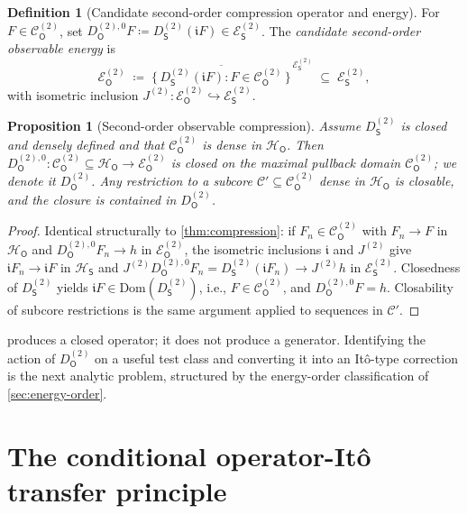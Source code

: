 \documentclass[11pt,reqno]{amsart}
\theoremstyle{plain}
\newtheorem{proposition}[theorem]{Proposition}
\theoremstyle{definition}
\newtheorem{definition}[theorem]{Definition}
\theoremstyle{remark}
\newcommand{\Hilb}{\mathcal{H}}
\newcommand{\Dom}{\mathrm{Dom}}
\newcommand{\Energy}{\mathcal{E}}
\newcommand{\Source}{\mathsf{S}}
\newcommand{\Obs}{\mathsf{O}}
\renewcommand{\iota}{\mathfrak{i}}
\begin{document}
\begin{definition}[Candidate second-order compression operator and energy]
\label{def:compression-2}
For $F\in\mathcal C_\Obs^{(2)}$, set
$D_\Obs^{(2),0}F\coloneqq D_\Source^{(2)}(\iota F)
\in\Energy_\Source^{(2)}$.
The \emph{candidate second-order observable energy} is
\[
  \Energy_\Obs^{(2)}
  \;\coloneqq\;
  \overline{\bigl\{\,D_\Source^{(2)}(\iota F):F\in\mathcal C_\Obs^{(2)}\,\bigr\}}
   ^{\,\Energy_\Source^{(2)}}
  \;\subseteq\;\Energy_\Source^{(2)},
\]
with isometric inclusion
$J^{(2)}\colon\Energy_\Obs^{(2)}\hookrightarrow\Energy_\Source^{(2)}$.
\end{definition}

\begin{proposition}[Second-order observable compression]
\label{prop:compression-2}
Assume $D_\Source^{(2)}$ is closed and densely defined and that
$\mathcal C_\Obs^{(2)}$ is dense in $\Hilb_\Obs$. Then
$D_\Obs^{(2),0}\colon\mathcal C_\Obs^{(2)}\subseteq\Hilb_\Obs
\to\Energy_\Obs^{(2)}$ is closed on the maximal pullback domain
$\mathcal C_\Obs^{(2)}$; we denote it $D_\Obs^{(2)}$. Any restriction
to a subcore $\mathcal C'\subseteq\mathcal C_\Obs^{(2)}$ dense in
$\Hilb_\Obs$ is closable, and the closure is contained in
$D_\Obs^{(2)}$.
\end{proposition}

\begin{proof}
Identical structurally to \cref{thm:compression}: if
$F_n\in\mathcal C_\Obs^{(2)}$ with $F_n\to F$ in $\Hilb_\Obs$ and
$D_\Obs^{(2),0}F_n\to h$ in $\Energy_\Obs^{(2)}$, the isometric
inclusions $\iota$ and $J^{(2)}$ give $\iota F_n\to\iota F$ in
$\Hilb_\Source$ and $J^{(2)}D_\Obs^{(2),0}F_n=D_\Source^{(2)}(\iota F_n)
\to J^{(2)}h$ in $\Energy_\Source^{(2)}$. Closedness of
$D_\Source^{(2)}$ yields $\iota F\in\Dom(D_\Source^{(2)})$, i.e.,
$F\in\mathcal C_\Obs^{(2)}$, and $D_\Obs^{(2),0}F=h$. Closability of
subcore restrictions is the same
argument applied to sequences in $\mathcal C'$.
\end{proof}

 produces a closed operator; it does not
produce a generator. Identifying the action of $D_\Obs^{(2)}$ on a
useful test class and converting it into an It\^o-type correction is
the next analytic problem, structured by the energy-order
classification of \cref{sec:energy-order}.

\section{The conditional operator-It\^o transfer principle}\label{sec:transfer}
\end{document}
